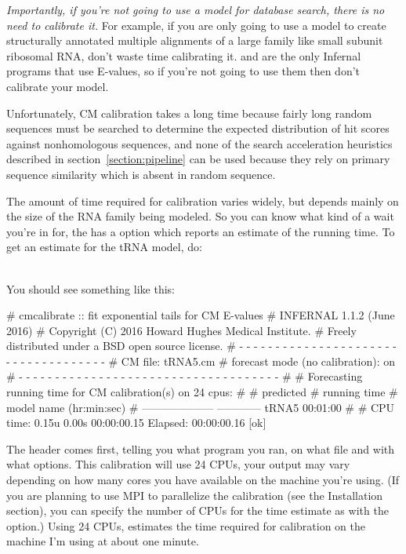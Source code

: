 \emph{Importantly, if you're not going to use a model for database
search, there is no need to calibrate it.} For example, if you are
only going to use a model to create structurally annotated multiple
alignments of a large family like small subunit ribosomal RNA, don't
waste time calibrating it.  and  are the
only Infernal programs that use E-values, so if you're not going to
use them then don't calibrate your model.

Unfortunately, CM calibration takes a long time because fairly long
random sequences must be searched to determine the expected
distribution of hit scores against nonhomologous sequences, and none
of the search acceleration heuristics described in
section~\ref{section:pipeline} can be used because they rely on
primary sequence similarity which is absent in random sequence.

The amount of time required for calibration varies widely, but
depends mainly on the size of the RNA family being modeled.
So you can know what kind of a wait you're in for, the
 has a  option which reports an
estimate of the running time. To get an estimate for the tRNA model, do:

\\

You should see something like this:

\begin{sreoutput}
# cmcalibrate :: fit exponential tails for CM E-values
# INFERNAL 1.1.2 (June 2016)
# Copyright (C) 2016 Howard Hughes Medical Institute.
# Freely distributed under a BSD open source license.
# - - - - - - - - - - - - - - - - - - - - - - - - - - - - - - - - - - - -
# CM file:                                     tRNA5.cm
# forecast mode (no calibration):              on
# - - - - - - - - - - - - - - - - - - - - - - - - - - - - - - - - - - - -
#
# Forecasting running time for CM calibration(s) on 24 cpus:
#
#                          predicted
#                       running time
# model name            (hr:min:sec)
# --------------------  ------------
  tRNA5                     00:01:00
#
# CPU time: 0.15u 0.00s 00:00:00.15 Elapsed: 00:00:00.16
[ok]
\end{sreoutput}

The header comes first, telling you what program you ran, on what file
and with what options. This calibration will use 24 CPUs, your output
may vary depending on how many cores you have available on the machine
you're using. (If you are planning to use MPI to parallelize the
calibration (see the Installation section), you can specify the number
of CPUs for the time estimate as  with the
 option.) Using 24 CPUs, 
estimates the time required for calibration on the machine I'm using
at about one minute.

